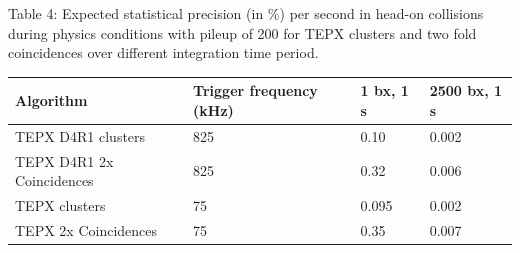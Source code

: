 Table 4: Expected statistical precision (in $\%$) per second in head-on collisions during physics conditions with pileup of 200 for TEPX clusters and two fold coincidences over different integration time period. 
\begin{center}
    \begin{tabular}{ | l | l | l | p{5cm} |}
    \hline
    Algorithm & Trigger frequency (kHz) & 1 bx, 1 s & 2500 bx, 1 s \\ \hline
    TEPX D4R1 clusters  & 825  & 0.10 & 0.002 \\ \hline  
    TEPX D4R1 2x Coincidences  & 825  & 0.32  & 0.006\\ \hline  
    TEPX clusters  & 75  & 0.095  & 0.002\\ \hline
    TEPX 2x Coincidences  & 75  & 0.35 &0.007 \\ \hline
    \hline
    \end{tabular}
\end{center}



